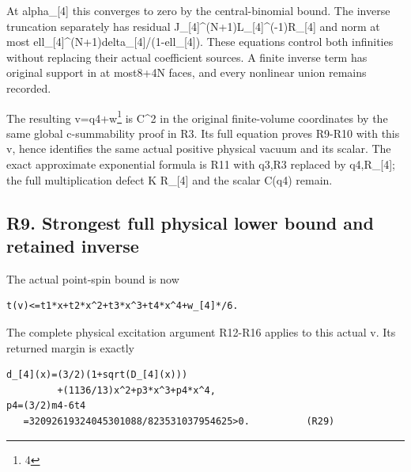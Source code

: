 \documentclass[11pt,a4paper]{article}
\renewcommand{\[}{\begingroup\small\originaldisplaystart}
\renewcommand{\]}{\originaldisplayend\endgroup}
\begin{document}
At alpha\_{[}4{]} this converges to zero by the central-binomial bound.
The inverse truncation separately has residual
{\ttfamily J\allowbreak{}\_\allowbreak{}[\allowbreak{}4\allowbreak{}]\allowbreak{}\textasciicircum{}\allowbreak{}(\allowbreak{}N\allowbreak{}+\allowbreak{}1\allowbreak{})\allowbreak{}L\allowbreak{}\_\allowbreak{}[\allowbreak{}4\allowbreak{}]\allowbreak{}\textasciicircum{}\allowbreak{}(\allowbreak{}-\allowbreak{}1\allowbreak{})\allowbreak{}R\allowbreak{}\_\allowbreak{}[\allowbreak{}4\allowbreak{}]\allowbreak{}}
and norm at most
{\ttfamily e\allowbreak{}l\allowbreak{}l\allowbreak{}\_\allowbreak{}[\allowbreak{}4\allowbreak{}]\allowbreak{}\textasciicircum{}\allowbreak{}(\allowbreak{}N\allowbreak{}+\allowbreak{}1\allowbreak{})\allowbreak{}d\allowbreak{}e\allowbreak{}l\allowbreak{}t\allowbreak{}a\allowbreak{}\_\allowbreak{}[\allowbreak{}4\allowbreak{}]\allowbreak{}/\allowbreak{}(\allowbreak{}1\allowbreak{}-\allowbreak{}e\allowbreak{}l\allowbreak{}l\allowbreak{}\_\allowbreak{}[\allowbreak{}4\allowbreak{}]\allowbreak{})\allowbreak{}}.
These equations control both infinities without replacing their actual
coefficient sources. A finite inverse term has original support in at
most8+4N faces, and every nonlinear union remains recorded.

The resulting v=q4+w\footnote{4} is C\^{}2 in the original finite-volume
coordinates by the same global c-summability proof in R3. Its full
equation proves R9-R10 with this v, hence identifies the same actual
positive physical vacuum and its scalar. The exact approximate
exponential formula is R11 with q3,R3 replaced by q4,R\_{[}4{]}; the
full multiplication defect K R\_{[}4{]} and the scalar C(q4) remain.

\subsection{R9. Strongest full physical lower bound and retained
inverse}\label{r9.-strongest-full-physical-lower-bound-and-retained-inverse}

The actual point-spin bound is now

\begin{verbatim}
t(v)<=t1*x+t2*x^2+t3*x^3+t4*x^4+w_[4]*/6.
\end{verbatim}

The complete physical excitation argument R12-R16 applies to this actual
v. Its returned margin is exactly

\begin{verbatim}
d_[4](x)=(3/2)(1+sqrt(D_[4](x)))
         +(1136/13)x^2+p3*x^3+p4*x^4,
p4=(3/2)m4-6t4
   =32092619324045301088/823531037954625>0.          (R29)
\end{verbatim}
\end{document}
